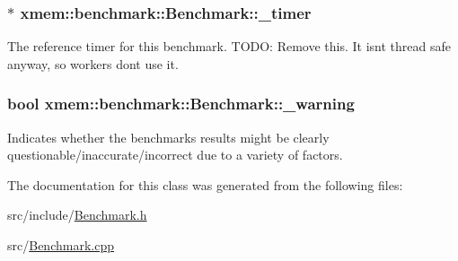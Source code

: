 \subsubsection[{\+\_\+timer}]{$\ast$ xmem\+::benchmark\+::\+Benchmark\+::\+\_\+timer\hspace{0.3cm}{\ttfamily [protected]}}\label{classxmem_1_1benchmark_1_1_benchmark_a673c700cb58ec0bc922f36d95dab12c9}
The reference timer for this benchmark. T\+O\+D\+O\+: Remove this. It isn\textquotesingle{}t thread safe anyway, so workers don\textquotesingle{}t use it. \hypertarget{classxmem_1_1benchmark_1_1_benchmark_af1a72e70f81c91f7c004ae01b2353288}{}
\subsubsection[{\+\_\+warning}]{\setlength{\rightskip}{0pt plus 5cm}bool xmem\+::benchmark\+::\+Benchmark\+::\+\_\+warning\hspace{0.3cm}{\ttfamily [protected]}}\label{classxmem_1_1benchmark_1_1_benchmark_af1a72e70f81c91f7c004ae01b2353288}
Indicates whether the benchmarks results might be clearly questionable/inaccurate/incorrect due to a variety of factors. 

The documentation for this class was generated from the following files\+:\begin{DoxyCompactItemize}
\item 
src/include/\hyperlink{_benchmark_8h}{Benchmark.\+h}\item 
src/\hyperlink{_benchmark_8cpp}{Benchmark.\+cpp}\end{DoxyCompactItemize}
